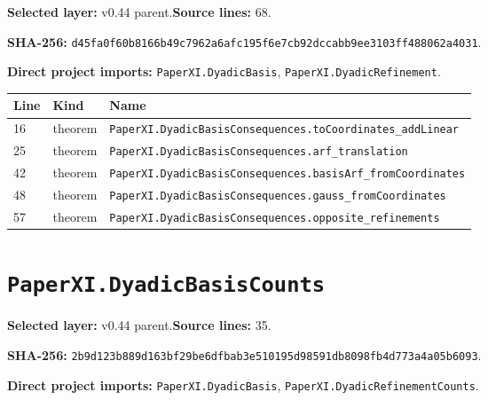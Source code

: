 \documentclass[10pt,oneside]{book}
\begin{document}
\textbf{Selected layer:} v0.44 parent.\quad\textbf{Source lines:} 68.\par\textbf{SHA-256:} {\scriptsize\nolinkurl{d45fa0f60b8166b49c7962a6afc195f6e7cb92dccabb9ee3103ff488062a4031}}.


\textbf{Direct project imports:} \nolinkurl{PaperXI.DyadicBasis}, \nolinkurl{PaperXI.DyadicRefinement}.

\begin{longtable}{@{}p{}p{}p{}@{}}\toprule Line&Kind&Name\\\midrule\endhead

16&theorem&\nolinkurl{PaperXI.DyadicBasisConsequences.toCoordinates_addLinear}\\

25&theorem&\nolinkurl{PaperXI.DyadicBasisConsequences.arf_translation}\\

42&theorem&\nolinkurl{PaperXI.DyadicBasisConsequences.basisArf_fromCoordinates}\\

48&theorem&\nolinkurl{PaperXI.DyadicBasisConsequences.gauss_fromCoordinates}\\

57&theorem&\nolinkurl{PaperXI.DyadicBasisConsequences.opposite_refinements}\\

\bottomrule\end{longtable}

\section{\texorpdfstring{\nolinkurl{PaperXI.DyadicBasisCounts}}{PaperXI.DyadicBasisCounts}}\label{module:PaperXI.DyadicBasisCounts}

\textbf{Selected layer:} v0.44 parent.\quad\textbf{Source lines:} 35.\par\textbf{SHA-256:} {\scriptsize\nolinkurl{2b9d123b889d163bf29be6dfbab3e510195d98591db8098fb4d773a4a05b6093}}.


\textbf{Direct project imports:} \nolinkurl{PaperXI.DyadicBasis}, \nolinkurl{PaperXI.DyadicRefinementCounts}.
\end{document}
